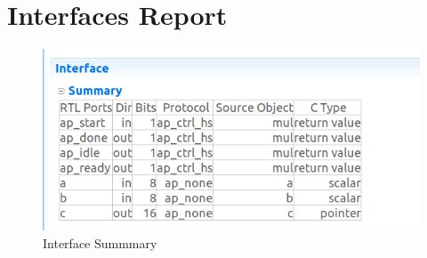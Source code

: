 \documentclass{article}
\begin{document}
\section{Interfaces Report}
\vspace{1cm}
\begin{figure}[h]
    \centering
\includegraphics[width=\columnwidth]{figs/interfaces.png}
    \caption{Interface Summmary}
    \label{fig:my_label}
\end{figure}
\vspace{5cm}
\end{document}
